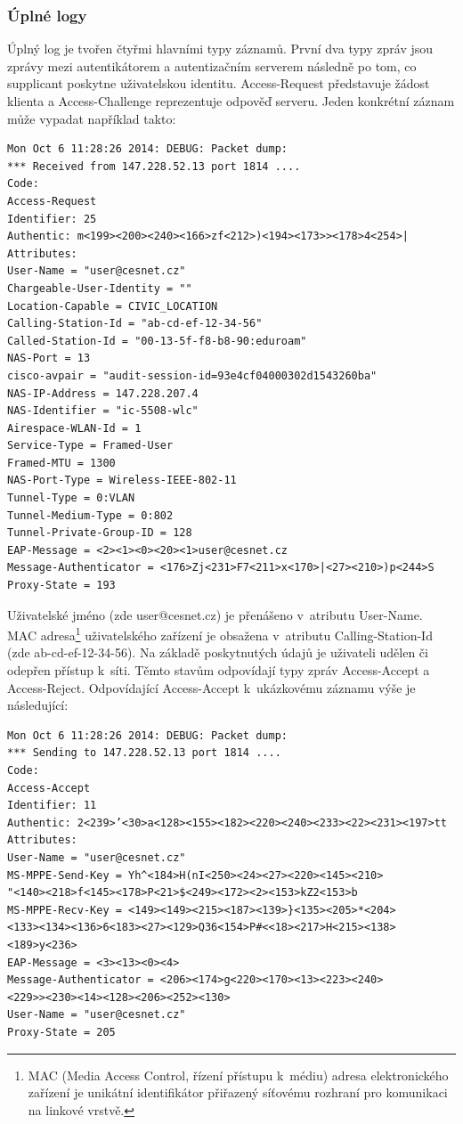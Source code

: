 \documentclass[thesis=M,czech]{FITthesis}[2012/06/26]
\begin{document}
  \subsubsection{Úplné logy}
  \label{full_logs}

    Úplný log je tvořen čtyřmi hlavními typy záznamů.
    První dva typy zpráv jsou zprávy mezi autentikátorem a autentizačním serverem následně po tom, co supplicant poskytne uživatelskou identitu.
    Access-Request představuje žádost klienta a Access-Challenge reprezentuje odpověď serveru. 
    Jeden konkrétní záznam může vypadat například takto:

    \begin{verbatim}
Mon Oct 6 11:28:26 2014: DEBUG: Packet dump:
*** Received from 147.228.52.13 port 1814 ....
Code:
Access-Request
Identifier: 25
Authentic: m<199><200><240><166>zf<212>)<194><173>><178>4<254>|
Attributes:
User-Name = "user@cesnet.cz"
Chargeable-User-Identity = ""
Location-Capable = CIVIC_LOCATION
Calling-Station-Id = "ab-cd-ef-12-34-56"
Called-Station-Id = "00-13-5f-f8-b8-90:eduroam"
NAS-Port = 13
cisco-avpair = "audit-session-id=93e4cf04000302d1543260ba"
NAS-IP-Address = 147.228.207.4
NAS-Identifier = "ic-5508-wlc"
Airespace-WLAN-Id = 1
Service-Type = Framed-User
Framed-MTU = 1300
NAS-Port-Type = Wireless-IEEE-802-11
Tunnel-Type = 0:VLAN
Tunnel-Medium-Type = 0:802
Tunnel-Private-Group-ID = 128
EAP-Message = <2><1><0><20><1>user@cesnet.cz
Message-Authenticator = <176>Zj<231>F7<211>x<170>|<27><210>)p<244>S
Proxy-State = 193
    \end{verbatim}

    Uživatelské jméno (zde user@cesnet.cz) je přenášeno v~atributu User-Name.
    MAC adresa\footnote{
       MAC (Media Access Control, řízení přístupu k~médiu) adresa elektronického zařízení je unikátní identifikátor přiřazený síťovému rozhraní
      pro komunikaci na linkové vrstvě.
    } 
    uživatelského zařízení je obsažena v~atributu Calling-Station-Id (zde ab-cd-ef-12-34-56).
    Na základě poskytnutých údajů je uživateli udělen či odepřen přístup k~síti.
    Těmto stavům odpovídají typy zpráv Access-Accept a Access-Reject.
    Odpovídající Access-Accept k~ukázkovému záznamu výše je následující:
    
    \begin{verbatim}
Mon Oct 6 11:28:26 2014: DEBUG: Packet dump:
*** Sending to 147.228.52.13 port 1814 ....
Code:
Access-Accept
Identifier: 11
Authentic: 2<239>’<30>a<128><155><182><220><240><233><22><231><197>tt
Attributes:
User-Name = "user@cesnet.cz"
MS-MPPE-Send-Key = Yh^<184>H(nI<250><24><27><220><145><210>
"<140><218>f<145><178>P<21>$<249><172><2><153>kZ2<153>b
MS-MPPE-Recv-Key = <149><149><215><187><139>}<135><205>*<204>
<133><134><136>6<183><27><129>Q36<154>P#<<18><217>H<215><138><189>y<236>
EAP-Message = <3><13><0><4>
Message-Authenticator = <206><174>g<220><170><13><223><240>
<229>><230><14><128><206><252><130>
User-Name = "user@cesnet.cz"
Proxy-State = 205
    \end{verbatim}
\end{document}
